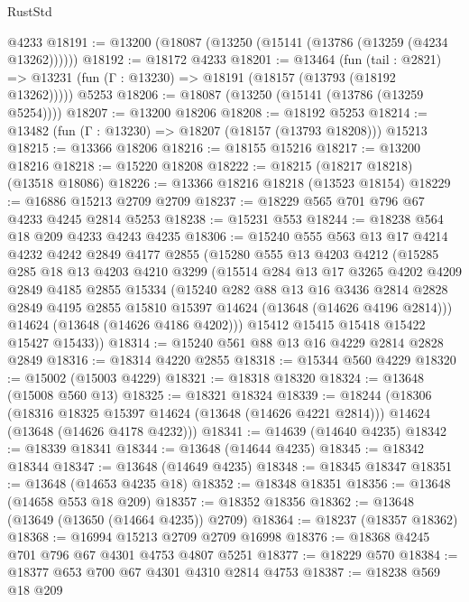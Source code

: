 \begin{lexlean}{RustStd}
\begin{coremodule}
    @4233
@18191 := @13200 (@18087 (@13250 (@15141 (@13786 (@13259 (@4234 @13262))))))
@18192 := @18172 @4233
@18201 := @13464
    (fun (tail : @2821) => @13231 (fun (Γ : @13230) => @18191 (@18157 (@13793 (@18192 @13262)))))
    @5253
@18206 := @18087 (@13250 (@15141 (@13786 (@13259 @5254))))
@18207 := @13200 @18206
@18208 := @18192 @5253
@18214 := @13482 (fun (Γ : @13230) => @18207 (@18157 (@13793 @18208))) @15213
@18215 := @13366 @18206
@18216 := @18155 @15216
@18217 := @13200 @18216
@18218 := @15220 @18208
@18222 := @18215 (@18217 @18218) (@13518 @18086)
@18226 := @13366 @18216 @18218 (@13523 @18154)
@18229 := @16886 @15213 @2709 @2709
@18237 := @18229 @565 @701 @796 @67 @4233 @4245 @2814 @5253
@18238 := @15231 @553
@18244 := @18238 @564 @18 @209 @4233 @4243 @4235
@18306 := @15240
    @555
    @563
    @13
    @17
    @4214
    @4232
    @4242
    @2849
    @4177
    @2855
    (@15280
      @555
      @13
      @4203
      @4212
      (@15285
        @285
        @18
        @13
        @4203
        @4210
        @3299
        (@15514
          @284
          @13
          @17
          @3265
          @4202
          @4209
          @2849
          @4185
          @2855
          @15334
          (@15240
            @282
            @88
            @13
            @16
            @3436
            @2814
            @2828
            @2849
            @4195
            @2855
            @15810
            @15397
            @14624
            (@13648 (@14626 @4196 @2814)))
          @14624
          (@13648 (@14626 @4186 @4202)))
        @15412
        @15415
        @15418
        @15422
        @15427
        @15433))
@18314 := @15240 @561 @88 @13 @16 @4229 @2814 @2828 @2849
@18316 := @18314 @4220 @2855
@18318 := @15344 @560 @4229
@18320 := @15002 (@15003 @4229)
@18321 := @18318 @18320
@18324 := @13648 (@15008 @560 @13)
@18325 := @18321 @18324
@18339 := @18244
    (@18306
      (@18316 @18325 @15397 @14624 (@13648 (@14626 @4221 @2814)))
      @14624
      (@13648 (@14626 @4178 @4232)))
@18341 := @14639 (@14640 @4235)
@18342 := @18339 @18341
@18344 := @13648 (@14644 @4235)
@18345 := @18342 @18344
@18347 := @13648 (@14649 @4235)
@18348 := @18345 @18347
@18351 := @13648 (@14653 @4235 @18)
@18352 := @18348 @18351
@18356 := @13648 (@14658 @553 @18 @209)
@18357 := @18352 @18356
@18362 := @13648 (@13649 (@13650 (@14664 @4235)) @2709)
@18364 := @18237 (@18357 @18362)
@18368 := @16994 @15213 @2709 @2709 @16998
@18376 := @18368 @4245 @701 @796 @67 @4301 @4753 @4807 @5251
@18377 := @18229 @570
@18384 := @18377 @653 @700 @67 @4301 @4310 @2814 @4753
@18387 := @18238 @569 @18 @209

\end{coremodule}
\end{lexlean}
